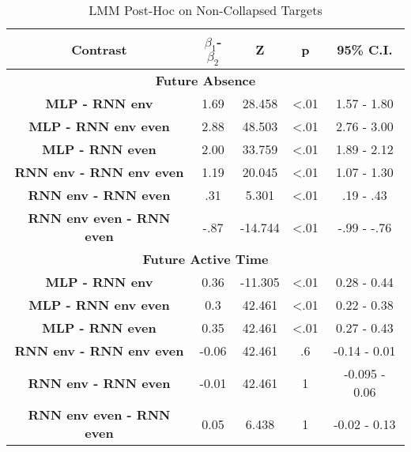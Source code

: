 \begin{table}[h]
\centering
\caption{LMM Post-Hoc on Non-Collapsed Targets}
\label{exploded_post_hoc_33}
\begin{tabular}{ccccc}
\hline
\textbf{Contrast}  & \textbf{$\beta_1$-$\beta_2$} & \textbf{Z} & \textbf{p} & \textbf{95\% C.I.}                  \\ \hline
\multicolumn{5}{c}{\textbf{Future Absence}}                                                                         \\ \hline
\textbf{MLP - RNN env} & 1.69                & 28.458     & \textless .01   & 1.57 - 1.80                    \\
\textbf{MLP - RNN env even}           & 2.88                & 48.503     & \textless .01   & 2.76 - 3.00                     \\
\textbf{MLP - RNN even}           & 2.00                & 33.759     & \textless .01   &  1.89 - 2.12                     \\
\textbf{RNN env - RNN env even}           & 1.19                & 20.045     & \textless .01   & 1.07 - 1.30                     \\
\textbf{RNN env - RNN even}           & .31                & 5.301     & \textless .01   & .19 - .43                     \\
\textbf{RNN env even - RNN even}          & -.87                & -14.744     & \textless .01   & -.99 - -.76                    \\ \hline

\multicolumn{5}{c}{\textbf{Future Active Time}}                                                                     \\ \hline
\textbf{MLP - RNN env} & 0.36                & -11.305     & \textless .01   & 0.28 - 0.44                     \\
\textbf{MLP - RNN env even}           & 0.3                 & 42.461     & \textless .01   & 0.22 - 0.38                     \\
\textbf{MLP - RNN even}           & 0.35                & 42.461     & \textless .01   & 0.27 - 0.43                     \\
\textbf{RNN env - RNN env even}           & -0.06                & 42.461     & .6   & -0.14 - 0.01                     \\
\textbf{RNN env - RNN even}           & -0.01                & 42.461     &  1   & -0.095 - 0.06                     \\
\textbf{RNN env even - RNN even}          & 0.05                & 6.438     &  1   & -0.02 - 0.13                    \\ \hline


\end{tabular}
\end{table}
